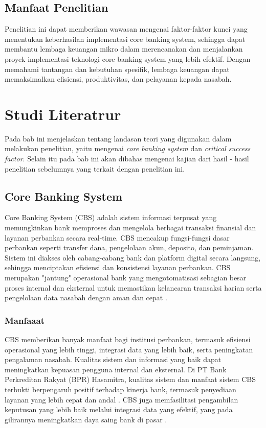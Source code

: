 \documentclass[journal,article,submit,pdftex,moreauthors]{Definitions/mdpi}
\begin{document}
\subsection{Manfaat Penelitian}
Penelitian ini dapat memberikan wawasan mengenai faktor-faktor kunci yang menentukan keberhasilan implementasi core banking system, sehingga dapat membantu lembaga keuangan mikro dalam merencanakan dan menjalankan proyek implementasi teknologi core banking system yang lebih efektif. Dengan memahami tantangan dan kebutuhan spesifik, lembaga keuangan dapat memaksimalkan efisiensi, produktivitas, dan pelayanan kepada nasabah.




\section{Studi Literatrur}

Pada bab ini menjelaskan tentang landasan teori yang digunakan dalam melakukan penelitian, yaitu mengenai \textit{core banking system} dan \textit{critical success factor}. Selain itu pada bab ini akan dibahas mengenai kajian dari hasil - hasil penelitian sebelumnya yang terkait dengan penelitian ini.

\subsection{Core Banking System}

Core Banking System (CBS) adalah sistem informasi terpusat yang memungkinkan bank memproses dan mengelola berbagai transaksi finansial dan layanan perbankan secara real-time. CBS mencakup fungsi-fungsi dasar perbankan seperti transfer dana, pengelolaan akun, deposito, dan peminjaman. Sistem ini diakses oleh cabang-cabang bank dan platform digital secara langsung, sehingga menciptakan efisiensi dan konsistensi layanan perbankan. CBS merupakan "jantung" operasional bank yang mengotomatisasi sebagian besar proses internal dan eksternal untuk memastikan kelancaran transaksi harian serta pengelolaan data nasabah dengan aman dan cepat \cite{Hsiao-ebanking}.

\subsubsection{Manfaaat}

CBS memberikan banyak manfaat bagi institusi perbankan, termasuk efisiensi operasional yang lebih tinggi, integrasi data yang lebih baik, serta peningkatan pengalaman nasabah. Kualitas sistem dan informasi yang baik dapat meningkatkan kepuasan pengguna internal dan eksternal. Di PT Bank Perkreditan Rakyat (BPR) Hasamitra, kualitas sistem dan manfaat sistem CBS terbukti berpengaruh positif terhadap kinerja bank, termasuk penyediaan layanan yang lebih cepat dan andal \cite{basyir-cbs}. CBS juga memfasilitasi pengambilan keputusan yang lebih baik melalui integrasi data yang efektif, yang pada gilirannya meningkatkan daya saing bank di pasar \cite{pratama-cbs}.
\end{document}
